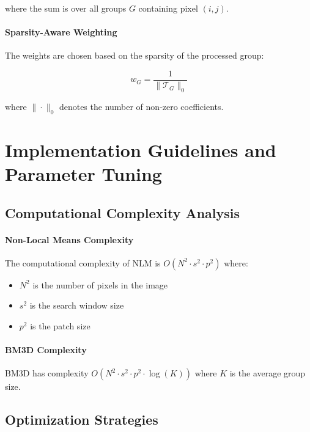 \documentclass[12pt]{article}
\begin{document}
where the sum is over all groups $G$ containing pixel $(i,j)$.

\paragraph{Sparsity-Aware Weighting}
The weights are chosen based on the sparsity of the processed group:

\begin{equation}
    \label{eq:sparsity_weight}
    w_G = \frac{1}{\|\mathcal{T}_G\|_0}
\end{equation}

where $\|\cdot\|_0$ denotes the number of non-zero coefficients.

\newpage

\section{Implementation Guidelines and Parameter Tuning}
\label{sec:practical}

\subsection{Computational Complexity Analysis}
\label{subsec:complexity}

\paragraph{Non-Local Means Complexity}
The computational complexity of NLM is $O(N^2 \cdot s^2 \cdot p^2)$ where:
\begin{itemize}
    \item $N^2$ is the number of pixels in the image
    \item $s^2$ is the search window size
    \item $p^2$ is the patch size
\end{itemize}

\paragraph{BM3D Complexity}
BM3D has complexity $O(N^2 \cdot s^2 \cdot p^2 \cdot \log(K))$ where $K$ is the average group size.

\subsection{Optimization Strategies}
\label{subsec:optimization}
\end{document}
